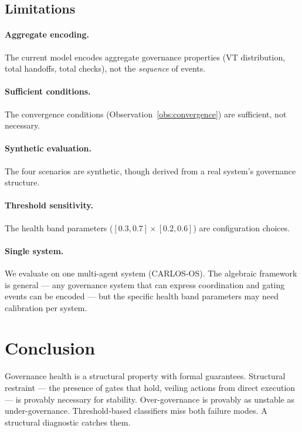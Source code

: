 \documentclass[sigconf,nonacm]{acmart}
\begin{document}
\subsection{Limitations}\label{sec:limitations}

\paragraph{Aggregate encoding.}
The current model encodes aggregate governance properties (VT
distribution, total handoffs, total checks), not the \emph{sequence} of
events.

\paragraph{Sufficient conditions.}
The convergence conditions (Observation~\ref{obs:convergence}) are
sufficient, not necessary.

\paragraph{Synthetic evaluation.}
The four scenarios are synthetic, though derived from a real system's
governance structure.

\paragraph{Threshold sensitivity.}
The health band parameters ($[0.3, 0.7] \times [0.2, 0.6]$) are
configuration choices.

\paragraph{Single system.}
We evaluate on one multi-agent system (CARLOS-OS). The algebraic
framework is general --- any governance system that can express
coordination and gating events can be encoded --- but the specific health
band parameters may need calibration per system.


\section{Conclusion}

Governance health is a structural property with formal guarantees.
Structural restraint --- the presence of gates that hold, veiling
actions from direct execution --- is provably necessary for stability.
Over-governance is provably as unstable as under-governance.
Threshold-based classifiers miss both failure modes. A structural
diagnostic catches them.
\end{document}

